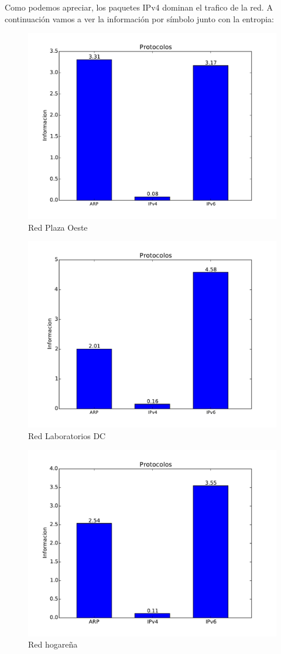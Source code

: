 Como podemos apreciar, los paquetes IPv4 dominan el trafico de la red. A continuación vamos a ver la información por símbolo junto con la entropia:

\begin{figure}[H]
\begin{center}
\includegraphics[width=0.7\columnwidth]{graficos/plaza_inf_s1.pdf}
\caption{Red Plaza Oeste}
\end{center}
\end{figure}

\begin{figure}[H]
\begin{center}
\includegraphics[width=0.7\columnwidth]{graficos/dc_inf_s1.pdf}
\caption{Red Laboratorios DC}
\end{center}
\end{figure}

\begin{figure}[H]
\begin{center}
\includegraphics[width=0.8\columnwidth]{graficos/hogar_inf_s1.pdf}
\caption{Red hogareña}
\end{center}
\end{figure}

